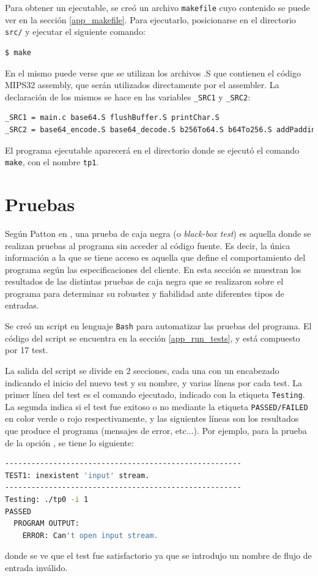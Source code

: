 Para obtener un ejecutable, se creó un archivo \texttt{makefile} cuyo contenido se puede ver en la sección \ref{app_makefile}. Para ejecutarlo, posicionarse en el directorio \texttt{src/} y ejecutar el siguiente comando:
\begin{lstlisting}[language=bash, style=StyleC]
    $ make
\end{lstlisting}

En el mismo puede verse que se utilizan los archivos .S que contienen el código MIPS32 assembly, que serán utilizados directamente por el assembler. La declaración de los mismos se hace en las variables \texttt{\_SRC1} y \texttt{\_SRC2}:
\begin{lstlisting}[language=bash, style=StyleC]
_SRC1 = main.c base64.S flushBuffer.S printChar.S
_SRC2 = base64_encode.S base64_decode.S b256To64.S b64To256.S addPadding.S
\end{lstlisting}

El programa ejecutable aparecerá en el directorio donde se ejecutó el comando \texttt{make}, con el nombre \texttt{tp1}.

\clearpage
\section{Pruebas}

Según Patton en \cite{book_patton}, una prueba de caja negra (o \emph{black-box test}) es aquella donde se realizan pruebas al programa sin acceder al código fuente. Es decir, la única información a la que se tiene acceso es aquella que define el comportamiento del programa según las especificaciones del cliente. En esta sección se muestran los resultados de las distintas pruebas de caja negra que se realizaron sobre el programa para determinar su robustez y fiabilidad ante diferentes tipos de entradas. 

Se creó un script en lenguaje \texttt{Bash} para automatizar las pruebas del programa.  El código del script se encuentra en la sección \ref{app_run_tests}, y está compuesto por 17 test.

La salida del script se divide en 2 secciones, cada una con un encabezado indicando el inicio del nuevo test y su nombre, y varias líneas por cada test. La primer línea del test es el comando ejecutado, indicado con la etiqueta \texttt{Testing}. La segunda indica si el test fue exitoso o no mediante la etiqueta \texttt{PASSED/FAILED} en color verde o rojo respectivamente, y las siguientes líneas son los resultados que produce el programa (mensajes de error, etc...). Por ejemplo, para la prueba de la opción , se tiene lo siguiente:
\begin{lstlisting}[language=bash, style=StyleC]
------------------------------------------------------
TEST1: inexistent 'input' stream.
------------------------------------------------------
Testing: ./tp0 -i 1
PASSED 
  PROGRAM OUTPUT:
	ERROR: Can't open input stream.
\end{lstlisting}
donde se ve que el test fue satisfactorio ya que se introdujo un nombre de flujo de entrada inválido.

